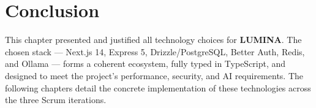 \section*{Conclusion}
This chapter presented and justified all technology choices for \textbf{LUMINA}.
The chosen stack --- Next.js 14, Express 5, Drizzle/PostgreSQL, Better Auth,
Redis, and Ollama --- forms a coherent ecosystem, fully typed in TypeScript,
and designed to meet the project's performance, security, and AI requirements.
The following chapters detail the concrete implementation of these technologies
across the three Scrum iterations.
